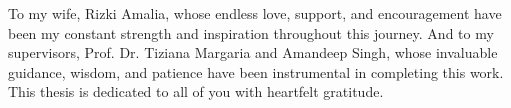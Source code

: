 
\begin{dedication}        %

    To my wife, Rizki Amalia, whose endless love, support, and encouragement have been my constant strength and inspiration throughout this journey. And to my supervisors, Prof. Dr. Tiziana Margaria and Amandeep Singh, whose invaluable guidance, wisdom, and patience have been instrumental in completing this work. This thesis is dedicated to all of you with heartfelt gratitude. \par



\end{dedication}


